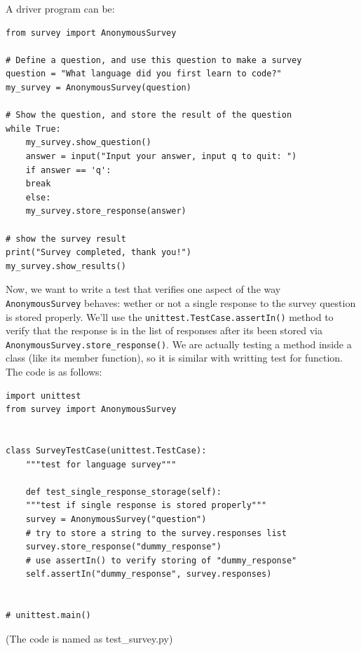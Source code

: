 \documentclass[12pt]{book}
\begin{document}
A driver program can be:
\begin{verbatim}
from survey import AnonymousSurvey

# Define a question, and use this question to make a survey
question = "What language did you first learn to code?"
my_survey = AnonymousSurvey(question)

# Show the question, and store the result of the question
while True:
    my_survey.show_question()
    answer = input("Input your answer, input q to quit: ")
    if answer == 'q':
	break
    else:
	my_survey.store_response(answer)

# show the survey result
print("Survey completed, thank you!")
my_survey.show_results()
\end{verbatim}

Now, we want to write a test that verifies one aspect of the way \texttt{AnonymousSurvey} behaves: wether or not a single response to the survey question is stored properly. We'll use the \texttt{unittest.TestCase.assertIn()} method to verify that the response is in the list of responses after its been stored via \texttt{AnonymousSurvey.store\_response()}. We are actually testing a method inside a class (like its member function), so it is similar with writting test for function. The code is as follows:
\begin{verbatim}
import unittest
from survey import AnonymousSurvey


class SurveyTestCase(unittest.TestCase):
    """test for language survey"""

    def test_single_response_storage(self):
	"""test if single response is stored properly"""
	survey = AnonymousSurvey("question")
	# try to store a string to the survey.responses list
	survey.store_response("dummy_response")
	# use assertIn() to verify storing of "dummy_response"
	self.assertIn("dummy_response", survey.responses)


# unittest.main()
\end{verbatim}
(The code is named as test\_survey.py)
\end{document}
